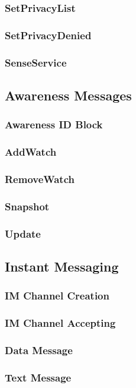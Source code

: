 \documentclass[titlepage,oneside]{book}
\begin{document}
\subsubsection{SetPrivacyList}
\subsubsection{SetPrivacyDenied}
\subsubsection{SenseService}

\subsection{Awareness Messages}
\subsubsection{Awareness ID Block}
\subsubsection{AddWatch}
\subsubsection{RemoveWatch}
\subsubsection{Snapshot}
\subsubsection{Update}

\subsection{Instant Messaging}
\subsubsection{IM Channel Creation}
\subsubsection{IM Channel Accepting}
\subsubsection{Data Message}
\subsubsection{Text Message}
\end{document}
